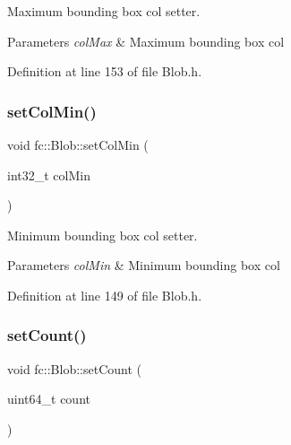 Maximum bounding box col setter. 


\begin{DoxyParams}{Parameters}
{\em col\+Max} & Maximum bounding box col \\
\hline
\end{DoxyParams}


Definition at line 153 of file Blob.\+h.

\mbox{\label{classfc_1_1Blob_aa9972e1dd32aa399426b87bc4c610d69}} 
\subsubsection{\texorpdfstring{set\+Col\+Min()}{setColMin()}}
{\footnotesize\ttfamily void fc\+::\+Blob\+::set\+Col\+Min (\begin{DoxyParamCaption}\item[{int32\+\_\+t}]{col\+Min }\end{DoxyParamCaption})\hspace{0.3cm}{\ttfamily [inline]}}



Minimum bounding box col setter. 


\begin{DoxyParams}{Parameters}
{\em col\+Min} & Minimum bounding box col \\
\hline
\end{DoxyParams}


Definition at line 149 of file Blob.\+h.

\mbox{\label{classfc_1_1Blob_a4f404eafaf95bd017eecfbd234eb650e}} 
\subsubsection{\texorpdfstring{set\+Count()}{setCount()}}
{\footnotesize\ttfamily void fc\+::\+Blob\+::set\+Count (\begin{DoxyParamCaption}\item[{uint64\+\_\+t}]{count }\end{DoxyParamCaption})\hspace{0.3cm}{\ttfamily [inline]}}



